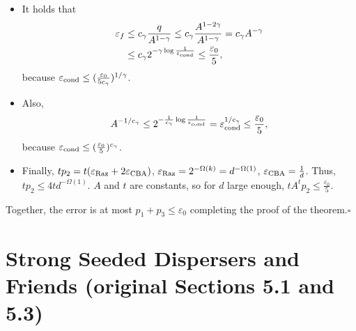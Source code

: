 \documentclass[10pt,a4paper]{article}
\begin{document}
\begin{itemize}
\item It holds that
\begin{align*}
\varepsilon_f&\le c_\gamma\frac q{A^{1-\gamma}}\le c_\gamma\frac{A^{1-2\gamma}}{A^{1-\gamma}}=c_\gamma A^{-\gamma}\\
&\le c_\gamma2^{-\gamma\log\frac1{\varepsilon_{\rm cond}}}\le\frac{\varepsilon_0}5,
\end{align*}
because $\varepsilon_{\rm cond}\le(\frac{\varepsilon_0}{5c_\gamma})^{1/\gamma}$.
\item Also,
\[A^{-1/c_\gamma}\le2^{-\frac1{c_\gamma}\log\frac1{\varepsilon_{\rm cond}}}=\varepsilon_{\rm cond}^{1/c_\gamma}\le\frac{\varepsilon_0}5,\]
because $\varepsilon_{\rm cond}\le(\frac{\varepsilon_0}5)^{c_\gamma}$.
\item Finally, $tp_2=t(\varepsilon_{\rm Raz}+2\varepsilon_{\rm CBA})$, $\varepsilon_{\rm Raz}=2^{-\Omega(k)}=d^{-\Omega(1)}$, $\varepsilon_{\rm CBA}=\frac1d$. Thus, $tp_2\le4td^{-\Omega(1)}$. $A$ and $t$ are constants, so for $d$ large enough, $tA^tp_2\le\frac{\varepsilon_0}5$.
\end{itemize}
Together, the error is at most $p_1+p_3\le\varepsilon_0$ completing the proof of the theorem.\hfill$\square$

\section*{Strong Seeded Dispersers and Friends (original Sections 5.1 and 5.3)}
\end{document}
